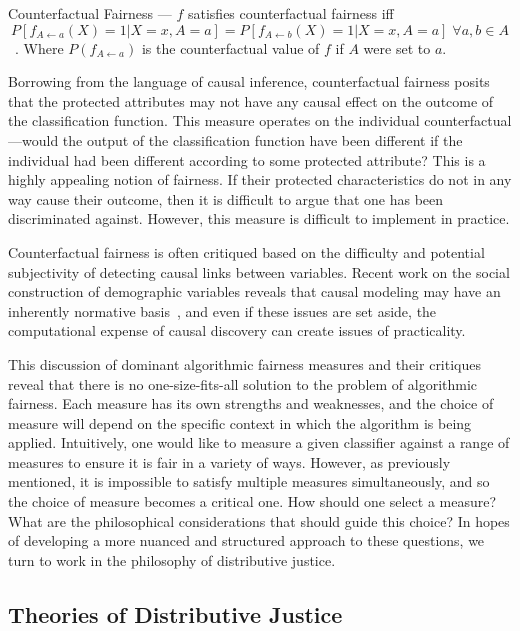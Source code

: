 \begin{definition}
    Counterfactual Fairness — $f$ satisfies counterfactual fairness iff
    \[P[f_{A \leftarrow a}(X) = 1 | X = x, A = a] = P[f_{A\leftarrow b}(X) = 1 |
         X = x, A = a]\;\forall a, b \in A\]~\citep{Kusner_2018}.
    Where $P(f_{A \leftarrow a})$ is the counterfactual value of $f$ if $A$ were
    set to $a$.
\end{definition}

Borrowing from the language of causal inference, counterfactual fairness posits
that the protected attributes may not have any causal effect on the outcome of
the classification function. This measure operates on the individual
counterfactual—would the output of the classification function have been 
different if the individual had been different according to some protected
attribute? This is a highly appealing notion of fairness.
If their protected characteristics do not in any way cause their outcome, then
it is difficult to argue that one has been discriminated against. However,
this measure is difficult to implement in practice.

Counterfactual fairness is often critiqued based on the difficulty and potential
subjectivity of detecting causal links between variables. Recent work on the 
social construction of demographic variables reveals that causal modeling may 
have an inherently normative basis~\citep{Hu_Forthcoming}, and even if these
issues are set aside, the computational expense of causal discovery can create
issues of practicality.

This discussion of dominant algorithmic fairness measures and their critiques
reveal that there is no one-size-fits-all solution to the problem of algorithmic
fairness. Each measure has its own strengths and weaknesses, and the choice of
measure will depend on the specific context in which the algorithm is being
applied. Intuitively, one would like to measure a given classifier against a
range of measures to ensure it is fair in a variety of ways. However, as
previously mentioned, it is impossible to satisfy multiple measures
simultaneously, and so the choice of measure becomes a critical one.
How should one select a measure? What are the philosophical
considerations that should guide this choice? In hopes of developing a more
nuanced and structured approach to these questions, we turn to work in the 
philosophy of distributive justice.

\subsection{Theories of Distributive Justice}

